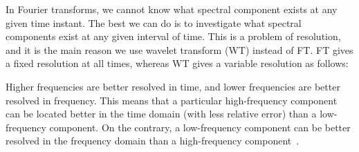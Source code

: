 In Fourier transforms, we cannot know what spectral component exists at any given time instant. The best we can do is to investigate what spectral components exist at any given interval of time. This is a problem of resolution, and it is the main reason we use wavelet transform (WT) instead of FT. FT gives a fixed resolution at all times, whereas WT gives a variable resolution as follows:

Higher frequencies are better resolved in time, and lower frequencies are better resolved in frequency. This means that a particular high-frequency component can be located better in the time domain (with less relative error) than a low-frequency component. On the contrary, a low-frequency component can be better resolved in the frequency domain than a high-frequency component~\cite{polikar1996wavelet}.

